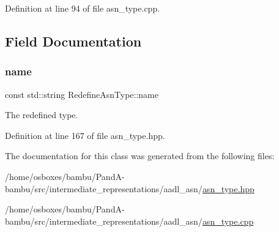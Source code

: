 Definition at line 94 of file asn\+\_\+type.\+cpp.



\subsection{Field Documentation}
\mbox{\label{classRedefineAsnType_abae8c5126b4432047963eb62d265ce6d}} 
\subsubsection{\texorpdfstring{name}{name}}
{\footnotesize\ttfamily const std\+::string Redefine\+Asn\+Type\+::name}



The redefined type. 



Definition at line 167 of file asn\+\_\+type.\+hpp.



The documentation for this class was generated from the following files\+:\begin{DoxyCompactItemize}
\item 
/home/osboxes/bambu/\+Pand\+A-\/bambu/src/intermediate\+\_\+representations/aadl\+\_\+asn/\hyperlink{asn__type_8hpp}{asn\+\_\+type.\+hpp}\item 
/home/osboxes/bambu/\+Pand\+A-\/bambu/src/intermediate\+\_\+representations/aadl\+\_\+asn/\hyperlink{asn__type_8cpp}{asn\+\_\+type.\+cpp}\end{DoxyCompactItemize}
